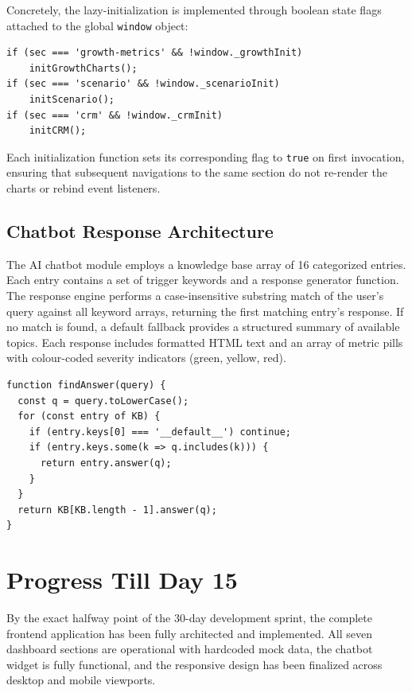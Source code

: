 \documentclass{book}
\begin{document}
Concretely, the lazy-initialization is implemented through boolean state flags attached to the global \texttt{window} object:

\begin{lstlisting}[style=jsstyle, caption={Lazy-initialization pattern in app.js}]
if (sec === 'growth-metrics' && !window._growthInit)
    initGrowthCharts();
if (sec === 'scenario' && !window._scenarioInit)
    initScenario();
if (sec === 'crm' && !window._crmInit)
    initCRM();
\end{lstlisting}

Each initialization function sets its corresponding flag to \texttt{true} on first invocation, ensuring that subsequent navigations to the same section do not re-render the charts or rebind event listeners.

\section{Chatbot Response Architecture}
The AI chatbot module employs a knowledge base array of 16 categorized entries. Each entry contains a set of trigger keywords and a response generator function. The response engine performs a case-insensitive substring match of the user's query against all keyword arrays, returning the first matching entry's response. If no match is found, a default fallback provides a structured summary of available topics. Each response includes formatted HTML text and an array of metric pills with colour-coded severity indicators (green, yellow, red).

\begin{lstlisting}[style=jsstyle, caption={Keyword-matching response engine in chatbot.js}]
function findAnswer(query) {
  const q = query.toLowerCase();
  for (const entry of KB) {
    if (entry.keys[0] === '__default__') continue;
    if (entry.keys.some(k => q.includes(k))) {
      return entry.answer(q);
    }
  }
  return KB[KB.length - 1].answer(q);
}
\end{lstlisting}

\chapter{Progress Till Day 15}
By the exact halfway point of the 30-day development sprint, the complete frontend application has been fully architected and implemented. All seven dashboard sections are operational with hardcoded mock data, the chatbot widget is fully functional, and the responsive design has been finalized across desktop and mobile viewports.
\end{document}
